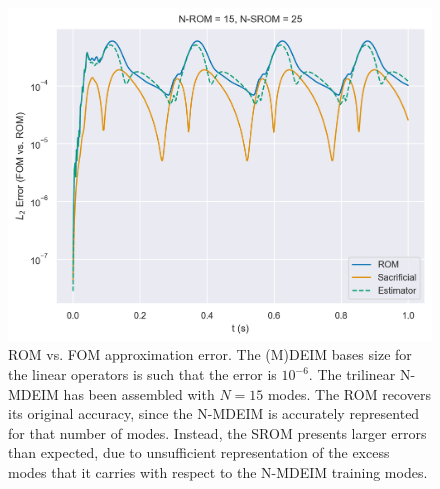 \documentclass[../../thesis.tex]{subfiles}
\begin{document}
\begin{figure}[h]
    \includegraphics[width =\columnwidth]{research_project/piston/figures/nonlinear_displacement/arbitrary/error_estimation_rom_15_srom_25_modes_15.png}
    \caption{ROM vs. FOM approximation error.
    The (M)DEIM bases size for the linear operators is such that the error is $10^{-6}$.
    The trilinear N-MDEIM has been assembled with $N=15$ modes. 
    The ROM recovers its original accuracy, since the N-MDEIM is accurately represented for 
    that number of modes.
    Instead, the SROM presents larger errors than expected, 
    due to unsufficient representation of the excess
    modes that it carries with respect to the N-MDEIM training modes.}
    \label{fig:nlinear_disp_modes_15_rom_15}
\end{figure}
\end{document}
